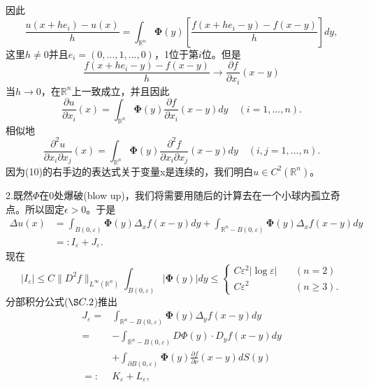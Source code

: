 \documentclass[leqno]{article}
\numberwithin{equation}{subsection}%
\begin{document}
因此
\begin{equation*}
\frac{u(x+he_{i})-u(x)}{h}=\int_{\mathbb{R}^{n}}\bm{\Phi}(y)\left[\frac{f(x+he_{i}-y)-f(x-y)}{h}\right]dy,
\end{equation*}
这里$h\neq 0$并且$e_{i}=(0,...,1,...,0)$，1位于第$i$位。但是
\begin{equation*}
\frac{f(x+he_{i}-y)-f(x-y)}{h}\rightarrow \frac{\partial f}{\partial x_{i}}(x-y)
\end{equation*}
当$h\rightarrow 0$，在$\mathbb{R}^{n}$上一致成立，并且因此
\begin{equation*}
\frac{\partial u}{\partial x_{i}}(x)=\int_{\mathbb{R}^{n}}\bm{\Phi}(y)\frac{\partial f}{\partial x_{i}}(x-y)dy\quad (i=1,...,n).
\end{equation*}
相似地
\begin{equation}
\frac{\partial^{2}u}{\partial x_{i}\partial x_{j}}(x)=\int_{\mathbb{R}^{n}}\bm{\Phi}(y)\frac{\partial^{2}f}{\partial x_{i}\partial x_{j}}(x-y)dy\quad (i,j=1,...,n).
\end{equation}
因为(10)的右手边的表达式关于变量x是连续的，我们明白$u\in C^{2}(\mathbb{R}^{n})$。
\par
2.既然$\Phi$在$0$处爆破(blow up)，我们将需要用随后的计算去在一个小球内孤立奇点。所以固定$\epsilon>0$。于是
\begin{equation}
\begin{aligned}
\Delta u(x)&=\int_{B(0,\varepsilon)}\bm{\Phi}(y)\Delta_{x}f(x-y)dy+\int_{\mathbb{R}^{n}-B(0,\varepsilon)}\bm{\Phi}(y)\Delta_{x}f(x-y)dy\\
&=:I_{\varepsilon}+J_{\varepsilon}.
\end{aligned}
\end{equation}
现在
\begin{equation}
|I_{\varepsilon}|\leq C\|D^{2}f\|_{L^{\infty}(\mathbb{R}^{n})}\int_{B(0,\varepsilon)}|\bm{\Phi}(y)|dy\leq
\begin{cases}
C\varepsilon^{2}|\log \varepsilon|\quad&(n=2)\\
C\varepsilon^{2}&(n\geq 3).
\end{cases}
\end{equation}
分部积分公式($\S C.2$)推出
\begin{equation}
\begin{aligned}
J_{\varepsilon}
={}&\int_{\mathbb{R}^{n}-B(0,\varepsilon)}\bm{\Phi}(y)\Delta_{y}f(x-y)dy\\
={}&-\int_{\mathbb{R}^{n}-B(0,\varepsilon)}D\Phi(y)\cdot D_{y}f(x-y)dy\\
&+\int_{\partial B(0,\varepsilon)}\bm{\Phi}(y)\frac{\partial f}{\partial\nu}(x-y)dS(y)\\
=:{}&K_{\varepsilon}+L_{\varepsilon},
\end{aligned}
\end{equation}
\end{document}
